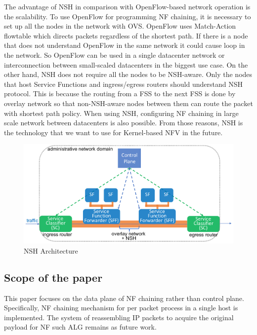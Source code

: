 \begin{itemize}
			The advantage of NSH in comparison with OpenFlow-based network operation is the scalability. To use OpenFlow for programming NF chaining, it is necessary to set up all the nodes in the network with OVS. OpenFlow uses Match-Action flowtable which directs packets regardless of the shortest path. If there is a node that does not understand OpenFlow in the same network it could cause loop in the network. So OpenFlow can be used in a single datacenter network or interconnection between small-scaled datacenters in the biggest use case. On the other hand, NSH does not require all the nodes to be NSH-aware. Only the nodes that host Service Functions and ingress/egress routers should understand NSH protocol. This is because the routing from a FSS to the next FSS is done by overlay network so that non-NSH-aware nodes between them can route the packet with shortest path policy. When using NSH, configuring NF chaining in large scale network between datacenters is also possible. From those reasons, NSH is the technology that we want to use for Kernel-based NFV in the future. 
	\end{itemize}
	
\begin{figure}[t]
	\centering
	\includegraphics[width=120mm]{pics/NSH.pdf}
	\caption{NSH Architecture}
	\label{fig: NSH}
\end{figure}

\subsection{Scope of the paper}
This paper focuses on the data plane of NF chaining rather than control plane.  Specifically, NF chaining mechanism for per packet process in a single host is implemented. The system of reassembling IP packets to acquire the original payload for NF such ALG remains as future work. 










